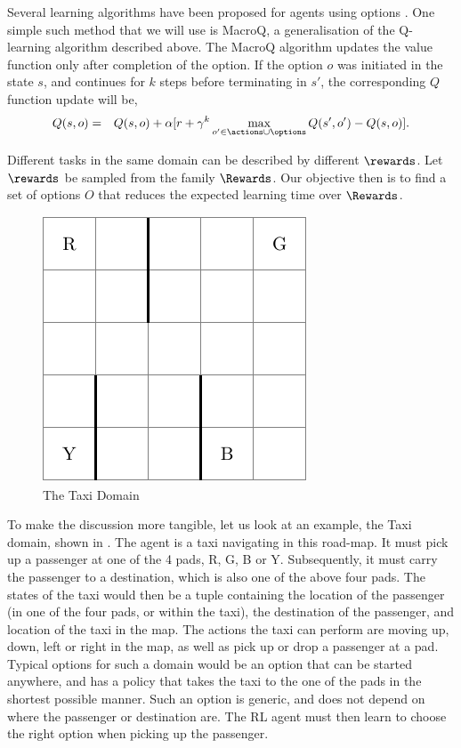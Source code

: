 Several learning algorithms have been proposed for agents using options
\cite{SuttonPrecupSingh1999,BartoMahadevan2003}. One simple such method that
we will use is MacroQ, a generalisation of the Q-learning algorithm
described above. The MacroQ algorithm updates the value function only
after completion of the option. If the option $o$ was initiated in the
state $s$, and continues for $k$ steps before terminating in $s'$, the
corresponding $Q$ function update will be,
\begin{eqnarray*}
    Q(s,o) &=& Q(s,o) + \alpha [ r + \gamma^{k} \max_{o' \in \actions \cup \options} Q(s',o') - Q(s,o) ].
\end{eqnarray*}

Different tasks in the same domain can be described by different
$\rewards$. Let $\rewards$ be sampled from the family $\Rewards$. Our
objective then is to find a set of options $O$ that reduces the expected
learning time over $\Rewards$.

\begin{example}
  \label{example:taxi}

\begin{figure}[th]
    \centering
    \includegraphics{figures/taxi}
    \caption{The Taxi Domain}
    \label{fig:taxi-domain}
\end{figure}
To make the discussion more tangible, let us look at an example, the
Taxi domain, shown in . The agent is a taxi
navigating in this road-map. It must pick up a passenger at one of the
4 pads, R, G, B or Y.  Subsequently, it must carry the passenger to a
destination, which is also one of the above four pads. The states of
the taxi would then be a tuple containing the location of the
passenger (in one of the four pads, or within the taxi), the
destination of the passenger, and location of the taxi in the map.
The actions the taxi can perform are moving up, down, left or right in
the map, as well as pick up or drop a passenger at a pad. 
Typical options for such a domain would be an option that can be
started anywhere, and has a policy that takes the taxi to the one of
the pads in the shortest possible manner. Such an option is generic,
and does not depend on where the passenger or destination are. The RL
agent must then learn to choose the right option when picking up the
passenger.
\end{example}

